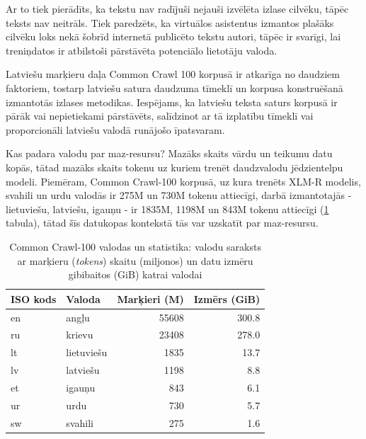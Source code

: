 Ar to tiek pierādīts, ka tekstu nav radījuši nejauši izvēlēta izlase cilvēku, tāpēc teksts nav neitrāls. Tiek paredzēts, ka virtuālos asistentus izmantos plašāks cilvēku loks nekā šobrīd internetā publicēto tekstu autori, tāpēc ir svarīgi, lai treniņdatos ir atbilstoši pārstāvēta potenciālo lietotāju valoda.


Latviešu marķieru daļa Common Crawl 100 korpusā ir atkarīga no daudziem faktoriem, tostarp latviešu satura daudzuma tīmeklī un korpusa konstruēšanā izmantotās izlases metodikas. Iespējams, ka latviešu teksta saturs korpusā ir pārāk vai nepietiekami pārstāvēts, salīdzinot ar tā izplatību tīmeklī vai proporcionāli latviešu valodā runājošo īpatsvaram.


Kas padara valodu par maz-resursu? Mazāks skaits vārdu un teikumu datu kopās, tātad mazāks skaits tokenu uz kuriem trenēt daudzvalodu jēdzientelpu modeli. Piemēram, Common Crawl-100 korpusā, uz kura trenēts XLM-R modelis, svahili un urdu valodās ir 275M un 730M tokenu attiecīgi, darbā izmantotajās - lietuviešu, latviešu, igauņu - ir 1835M, 1198M un 843M tokenu attiecīgi (\ref{tab:cc-100} tabula), tātad šīs datukopas kontekstā tās var uzskatīt par maz-resursu.


\begin{table}[htbp]
    \centering
    \caption{Common Crawl-100 valodas un statistika: valodu saraksts ar marķieru (\textit{tokens}) skaitu (miljonos) un datu izmēru gibibaitos (GiB) katrai valodai}
    \begin{tabular}{llrr}
        \toprule
        ISO kods & Valoda     & Marķieri (M) & Izmērs (GiB) \\\midrule
        en       & angļu      & 55608        & 300.8        \\
        ru       & krievu     & 23408        & 278.0        \\
        lt       & lietuviešu & 1835         & 13.7         \\
        lv       & latviešu   & 1198         & 8.8          \\
        et       & igauņu     & 843          & 6.1          \\
        ur       & urdu       & 730          & 5.7          \\
        sw       & svahili    & 275          & 1.6          \\\bottomrule
    \end{tabular}
    \label{tab:cc-100}
\end{table}


